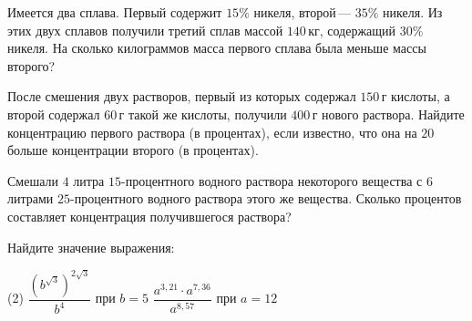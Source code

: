 \begin{class}[number=8]
\begin{listofex}
		\item Имеется два сплава. Первый содержит \(15\%\) никеля, второй --- \(35\%\) никеля. Из этих двух сплавов получили третий сплав массой \(140\) кг, содержащий \(30\%\) никеля. На сколько килограммов масса первого сплава была меньше массы второго?
		\item После смешения двух растворов, первый из которых содержал \(150\) г кислоты, а второй содержал \(60\) г такой же кислоты, получили \(400\) г нового раствора. Найдите концентрацию первого раствора (в процентах), если известно, что она на \(20\) больше концентрации второго (в процентах).
		
		\item Смешали \(4\) литра \(15\)-процентного водного раствора некоторого вещества с \(6\) литрами \(25\)-процентного водного раствора этого же вещества. Сколько процентов составляет концентрация получившегося раствора?
		\item Найдите значение выражения:
		\begin{tasks}(2)
			\task \( \dfrac{ (b^{\sqrt{3}})^{2\sqrt{3}} }{ b^4 } \) при \(b=5\)
			\task \( \dfrac{ a^{3,21} \cdot a^{7,36} }{ a^{8,57} } \) при \(a=12\)
		\end{tasks}
	\end{listofex}
\end{class}

